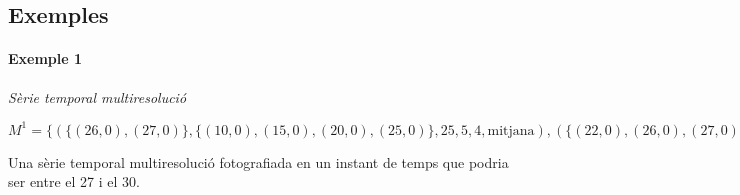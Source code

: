 \subsection{Exemples}

\paragraph{Exemple 1} \emph{Sèrie temporal multiresolució}

\todo{}

$M^1 = \{ ( \{(26,0),(27,0)\}  , \{(10,0),(15,0),(20,0),(25,0)\} , 25 , 5 ,4 , \text{mitjana} ) , ( \{(22,0),(26,0),(27,0)\} , \{(10,0),(20,0)\} , 20 , 10 ,2 , \text{mitjana} ) \}$


Una sèrie temporal multiresolució fotografiada en un instant de temps que podria
ser entre el 27 i el 30.



